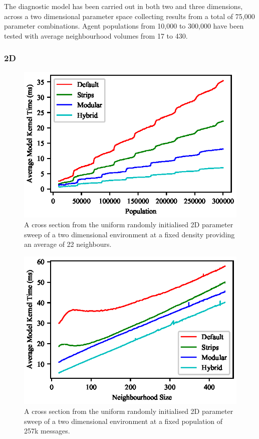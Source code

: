     The diagnostic model has been carried out in both two and three dimensions, across a two dimensional parameter space collecting results from a total of 75,000 parameter combinations. Agent populations from 10,000 to 300,000 have been tested with average neighbourhood volumes from 17 to 430.
    \subsubsection{2D}
\begin{figure}[!t]
\centering
\includegraphics[width=\linewidth]{../resources/results/2d/22_neighbours.eps}
\caption{\label{fig:graph-2d-22neighbour-uniformrandom}A cross section from the uniform randomly initialised 2D parameter sweep of a two dimensional environment at a fixed density providing an average of 22 neighbours.}
\end{figure}
\begin{figure}[!t]
\centering
\includegraphics[width=\linewidth]{../resources/results/2d/257k_messages.eps}
\caption{\label{fig:graph-2d-257k message-uniformrandom}A cross section from the uniform randomly initialised 2D parameter sweep of a two dimensional environment at a fixed population of 257k messages.}
\end{figure}
